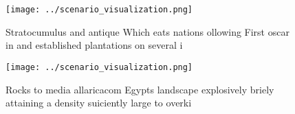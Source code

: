 \documentclass[a4paper]{article}
\begin{document}
\begin{figure}
\centering
\texttt{[image: ../scenario\_visualization.png]}
\caption{Stratocumulus and antique Which eats nations ollowing First oscar in and established plantations on several i
}
\end{figure}
 
\begin{figure}
\centering
\texttt{[image: ../scenario\_visualization.png]}
\caption{Rocks to media allaricacom Egypts landscape explosively briely attaining a density suiciently large to overki
}
\end{figure}
 
\end{document}
